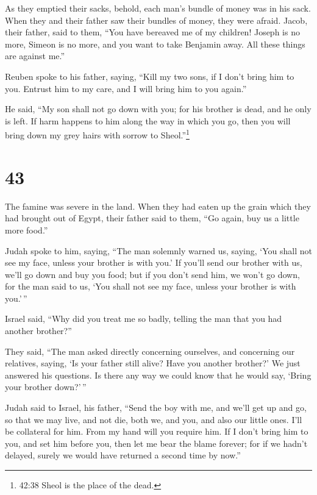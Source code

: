  As they emptied their sacks, behold, each man's bundle of
money was in his sack. When they and their father saw their bundles of
money, they were afraid.  Jacob, their father, said to
them, ``You have bereaved me of my children! Joseph is no more, Simeon
is no more, and you want to take Benjamin away. All these things are
against me.''

 Reuben spoke to his father, saying, ``Kill my two sons, if
I don't bring him to you. Entrust him to my care, and I will bring him
to you again.''

 He said, ``My son shall not go down with you; for his
brother is dead, and he only is left. If harm happens to him along the
way in which you go, then you will bring down my grey hairs with sorrow
to Sheol.''\footnote{42:38 Sheol is the place of the dead.}

\hypertarget{section-42}{%
\section{43}\label{section-42}}

 The famine was severe in the land.  When they
had eaten up the grain which they had brought out of Egypt, their father
said to them, ``Go again, buy us a little more food.''

 Judah spoke to him, saying, ``The man solemnly warned us,
saying, `You shall not see my face, unless your brother is with you.'
 If you'll send our brother with us, we'll go down and buy
you food;  but if you don't send him, we won't go down, for
the man said to us, `You shall not see my face, unless your brother is
with you.'\,''

 Israel said, ``Why did you treat me so badly, telling the
man that you had another brother?''

 They said, ``The man asked directly concerning ourselves,
and concerning our relatives, saying, `Is your father still alive? Have
you another brother?' We just answered his questions. Is there any way
we could know that he would say, `Bring your brother down?'\,''

 Judah said to Israel, his father, ``Send the boy with me,
and we'll get up and go, so that we may live, and not die, both we, and
you, and also our little ones.  I'll be collateral for him.
From my hand will you require him. If I don't bring him to you, and set
him before you, then let me bear the blame forever;  for if
we hadn't delayed, surely we would have returned a second time by now.''

